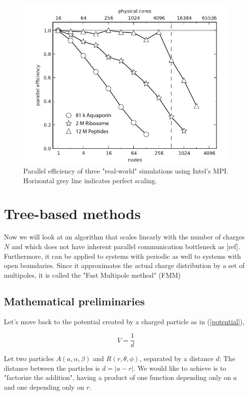 \documentclass[12pt,twoside,a4paper]{report}
\begin{document}
\begin{figure}[H]
\includegraphics[scale=0.6]{scalingMUC}
 \centering 
\caption{ Parallel efficiency of three "real-world" simulations using Intel's MPI. Horizontal grey line indicates perfect scaling.}
\label{fig:scaling}
\end{figure}



\section{Tree-based methods}

Now we will look at an algorithm that scales linearly with the number of charges $N$ and which does not have inherent parallel communication bottleneck as [ref].
Furthermore, it can be applied to systems with periodic as well to systems with open boundaries. Since it approximates the actual charge distribution by a set of multipoles, it is called the "Fast Multipole method" (FMM)
    
	\subsection{Mathematical preliminaries}
	
	Let's move back to the potential created by a charged particle as in (\ref{potential}),
	
	\begin{equation*}
	V = \frac{1}{d}
	\end{equation*}
	
	Let two particles $A(a,\alpha,\beta)$ and $R(r,\theta,\phi)$, separated by a distance $d$: The distance between the particles is $d = |a - r|$.
	We would like to achieve is to "factorize the addition", having a product of one function depending only on $a$ and one depending only on $r$.
	
\end{document}
